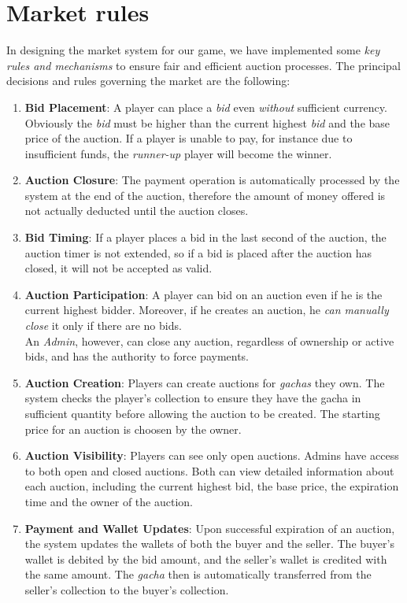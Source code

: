 \documentclass{article}
\begin{document}
\section{Market rules} \label{sec:market_rules}
In designing the market system for our game, we have implemented some \emph{key rules and mechanisms} to ensure fair and efficient auction processes. The principal decisions and rules governing the market are the following:
\begin{enumerate}
    \item \textbf{Bid Placement}: A player can place a \emph{bid} even \emph{without} sufficient currency. Obviously the \emph{bid} must be higher than the current highest \emph{bid} and the base price of the auction. If a player is unable to pay, for instance due to insufficient funds, the \emph{runner-up} player will become the winner.
    \item \textbf{Auction Closure}: The payment operation is automatically processed by the system at the end of the auction, therefore the amount of money offered is not actually deducted until the auction closes.
    \item \textbf{Bid Timing}: If a player places a bid in the last second of the auction, the auction timer is not extended, so if a bid is placed after the auction has closed, it will not be accepted as valid.
    \item \textbf{Auction Participation}: A player can bid on an auction even if he is the current highest bidder. Moreover, if he creates an auction, he \emph{can manually close} it only if there are no bids. \\
          An \emph{Admin}, however, can close any auction, regardless of ownership or active bids, and has the authority to force payments.
    \item \textbf{Auction Creation}: Players can create auctions for \emph{gachas} they own. The system checks the player's collection to ensure they have the gacha in sufficient quantity before allowing the auction to be created. The starting price for an auction is choosen by the owner.
    \item \textbf{Auction Visibility}: Players can see only open auctions. Admins have access to both open and closed auctions. Both can view detailed information about each auction, including the current highest bid, the base price, the expiration time and the owner of the auction.
    \item \textbf{Payment and Wallet Updates}: Upon successful expiration of an auction, the system updates the wallets of both the buyer and the seller. The buyer's wallet is debited by the bid amount, and the seller's wallet is credited with the same amount. The \emph{gacha} then is automatically transferred from the seller's collection to the buyer's collection.
\end{enumerate}
\end{document}
